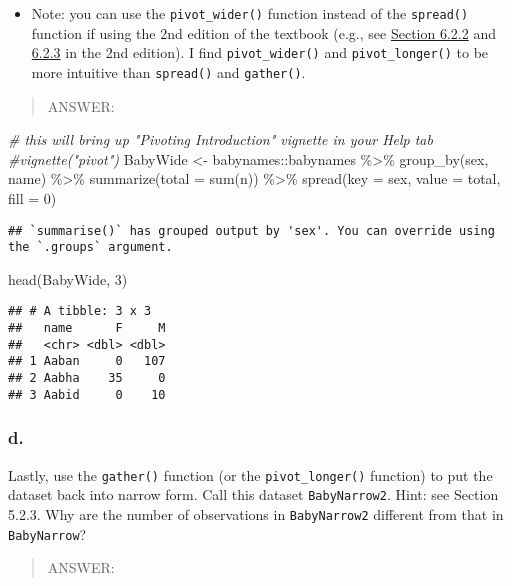 \documentclass[
]{article}
\newenvironment{Shaded}{\begin{snugshade}}{\end{snugshade}}
\newcommand{\AttributeTok}[1]{\textcolor[rgb]{0.77,0.63,0.00}{#1}}
\newcommand{\CommentTok}[1]{\textcolor[rgb]{0.56,0.35,0.01}{\textit{#1}}}
\newcommand{\DecValTok}[1]{\textcolor[rgb]{0.00,0.00,0.81}{#1}}
\newcommand{\FunctionTok}[1]{\textcolor[rgb]{0.00,0.00,0.00}{#1}}
\newcommand{\NormalTok}[1]{#1}
\newcommand{\OtherTok}[1]{\textcolor[rgb]{0.56,0.35,0.01}{#1}}
\newcommand{\SpecialCharTok}[1]{\textcolor[rgb]{0.00,0.00,0.00}{#1}}
\providecommand{\tightlist}{%
  \setlength{\itemsep}{0pt}\setlength{\parskip}{0pt}}
\begin{document}
\begin{itemize}
\tightlist
\item
  Note: you can use the \texttt{pivot\_wider()} function instead of the
  \texttt{spread()} function if using the 2nd edition of the textbook
  (e.g., see
  \href{https://mdsr-book.github.io/mdsr2e/ch-dataII.html\#pivoting-wider}{Section
  6.2.2} and
  \href{https://mdsr-book.github.io/mdsr2e/ch-dataII.html\#pivoting-longer}{6.2.3}
  in the 2nd edition). I find \texttt{pivot\_wider()} and
  \texttt{pivot\_longer()} to be more intuitive than \texttt{spread()}
  and \texttt{gather()}.
\end{itemize}

\begin{quote}
ANSWER:
\end{quote}

\begin{Shaded}
\begin{Highlighting}[]
\CommentTok{\# this will bring up "Pivoting Introduction" vignette in your Help tab}
\CommentTok{\#vignette("pivot")}
\NormalTok{BabyWide }\OtherTok{\textless{}{-}}\NormalTok{ babynames}\SpecialCharTok{::}\NormalTok{babynames }\SpecialCharTok{\%\textgreater{}\%}
\FunctionTok{group\_by}\NormalTok{(sex, name) }\SpecialCharTok{\%\textgreater{}\%}
\FunctionTok{summarize}\NormalTok{(}\AttributeTok{total =} \FunctionTok{sum}\NormalTok{(n)) }\SpecialCharTok{\%\textgreater{}\%}
\FunctionTok{spread}\NormalTok{(}\AttributeTok{key =}\NormalTok{ sex, }\AttributeTok{value =}\NormalTok{ total, }\AttributeTok{fill =} \DecValTok{0}\NormalTok{)}
\end{Highlighting}
\end{Shaded}

\begin{verbatim}
## `summarise()` has grouped output by 'sex'. You can override using the `.groups` argument.
\end{verbatim}

\begin{Shaded}
\begin{Highlighting}[]
\FunctionTok{head}\NormalTok{(BabyWide, }\DecValTok{3}\NormalTok{)}
\end{Highlighting}
\end{Shaded}

\begin{verbatim}
## # A tibble: 3 x 3
##   name      F     M
##   <chr> <dbl> <dbl>
## 1 Aaban     0   107
## 2 Aabha    35     0
## 3 Aabid     0    10
\end{verbatim}

\hypertarget{d.}{%
\subsubsection{d.}\label{d.}}

Lastly, use the \texttt{gather()} function (or the
\texttt{pivot\_longer()} function) to put the dataset back into narrow
form. Call this dataset \texttt{BabyNarrow2}. Hint: see Section 5.2.3.
Why are the number of observations in \texttt{BabyNarrow2} different
from that in \texttt{BabyNarrow}?

\begin{quote}
ANSWER:
\end{quote}
\end{document}
